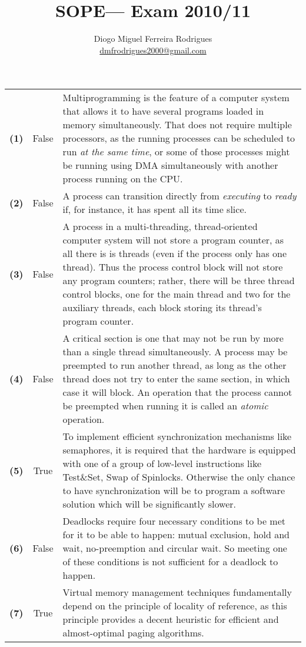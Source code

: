 \documentclass{sope}
\title{SOPE--- Exam 2010/11}
\author{Diogo Miguel Ferreira Rodrigues \\ \href{mailto:dmfrodrigues2000@gmail.com}{dmfrodrigues2000@gmail.com}}
\begin{document}
\setcounter{chapter}{10}
\begin{center} 
    \begin{longtable}{c | c p{132mm}}
        \textbf{(1)} & False & Multiprogramming is the feature of a computer system that allows it to have several programs loaded in memory simultaneously. That does not require multiple processors, as the running processes can be scheduled to run \emph{at the same time}, or some of those processes might be running using DMA simultaneously with another process running on the CPU. \\
        \textbf{(2)} & False & A process can transition directly from \emph{executing} to \emph{ready} if, for instance, it has spent all its time slice. \\
        \textbf{(3)} & False & A process in a multi-threading, thread-oriented computer system will not store a program counter, as all there is is threads (even if the process only has one thread). Thus the process control block will not store any program counters; rather, there will be three thread control blocks, one for the main thread and two for the auxiliary threads, each block storing its thread's program counter. \\
        \textbf{(4)} & False & A critical section is one that may not be run by more than a single thread simultaneously. A process may be preempted to run another thread, as long as the other thread does not try to enter the same section, in which case it will block. An operation that the process cannot be preempted when running it is called an \emph{atomic} operation. \\
        \textbf{(5)} & True & To implement efficient synchronization mechanisms like semaphores, it is required that the hardware is equipped with one of a group of low-level instructions like Test\&Set, Swap of Spinlocks. Otherwise the only chance to have synchronization will be to program a software solution which will be significantly slower. \\
        \textbf{(6)} & False & Deadlocks require four necessary conditions to be met for it to be able to happen: mutual exclusion, hold and wait, no-preemption and circular wait. So meeting one of these conditions is not sufficient for a deadlock to happen. \\
        \textbf{(7)} & True & Virtual memory management techniques fundamentally depend on the principle of locality of reference, as this principle provides a decent heuristic for efficient and almost-optimal paging algorithms. \\

\end{longtable}
\end{center}
\end{document}
